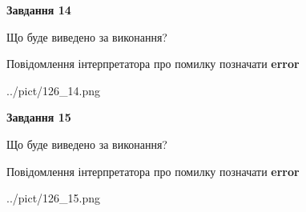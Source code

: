 \documentclass[11pt, ukrainian]{article}
\begin{document}
{\begin {large}
{\begin {center}\textbf{Завдання 14}\end {center}}\par
Що буде виведено за виконання? \par
Повідомлення інтерпретатора про помилку позначати \textbf{error}

\begin{center}
	{../pict/126_14.png}
\end{center}
\newpage

{\begin {center}\textbf{Завдання 15}\end {center}}\par
Що буде виведено за виконання? \par
Повідомлення інтерпретатора про помилку позначати \textbf{error}

\begin{center}
	{../pict/126_15.png}
\end{center}
\newpage

\end {large}}
\end{document}
